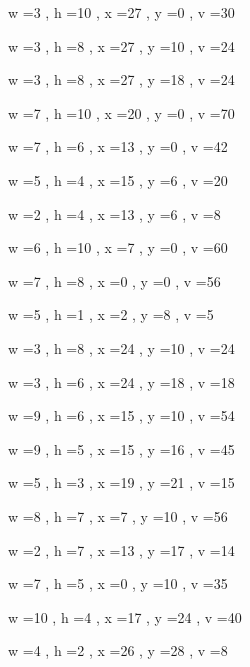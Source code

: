 \documentclass[11pt]{article}
\begin{document}
w =3 , h =10 , x =27 , y =0 , v =30
\par
w =3 , h =8 , x =27 , y =10 , v =24
\par
w =3 , h =8 , x =27 , y =18 , v =24
\par
w =7 , h =10 , x =20 , y =0 , v =70
\par
w =7 , h =6 , x =13 , y =0 , v =42
\par
w =5 , h =4 , x =15 , y =6 , v =20
\par
w =2 , h =4 , x =13 , y =6 , v =8
\par
w =6 , h =10 , x =7 , y =0 , v =60
\par
w =7 , h =8 , x =0 , y =0 , v =56
\par
w =5 , h =1 , x =2 , y =8 , v =5
\par
w =3 , h =8 , x =24 , y =10 , v =24
\par
w =3 , h =6 , x =24 , y =18 , v =18
\par
w =9 , h =6 , x =15 , y =10 , v =54
\par
w =9 , h =5 , x =15 , y =16 , v =45
\par
w =5 , h =3 , x =19 , y =21 , v =15
\par
w =8 , h =7 , x =7 , y =10 , v =56
\par
w =2 , h =7 , x =13 , y =17 , v =14
\par
w =7 , h =5 , x =0 , y =10 , v =35
\par
w =10 , h =4 , x =17 , y =24 , v =40
\par
w =4 , h =2 , x =26 , y =28 , v =8
\par
\newpage
\end{document}
